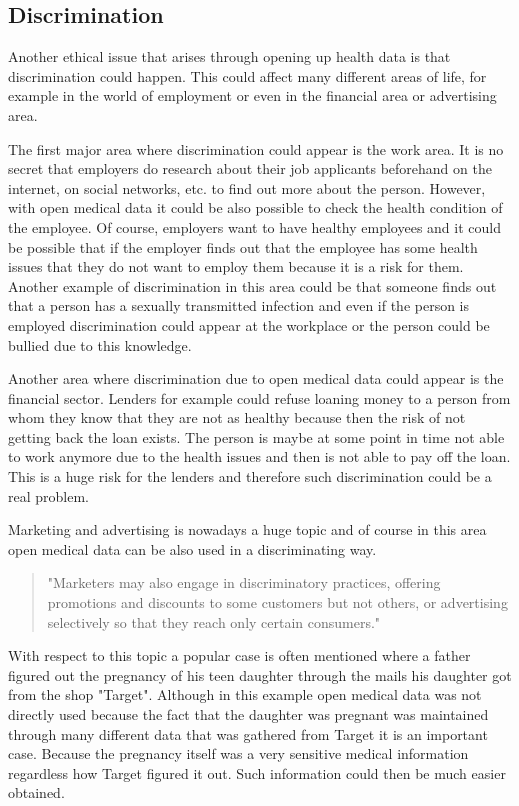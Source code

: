 \documentclass[a4paper, 11pt]{article}
\begin{document}
\subsection{Discrimination}
Another ethical issue that arises through opening up health data is that discrimination could happen. This could affect many different areas of life, for example in the world of employment or even in the financial area or advertising area. 

The first major area where discrimination could appear is the work area. It is no secret that employers do research about their job applicants beforehand on the internet, on social networks, etc. to find out more about the person. However, with open medical data it could be also possible to check the health condition of the employee. Of course, employers want to have healthy employees and it could be possible that if the employer finds out that the employee has some health issues that they do not want to employ them because it is a risk for them. Another example of discrimination in this area could be that someone finds out that  a person has a sexually transmitted infection and even if the person is employed discrimination could appear at the workplace or the person could be bullied due to this knowledge. \cite{price2019privacy}

Another area where discrimination due to open medical data could appear is the financial sector. Lenders for example could refuse loaning money to a person from whom they know that they are not as healthy because then the risk of not getting back the loan exists. The person is maybe at some point in time not able to work anymore due to the health issues and then is not able to pay off the loan. This is a huge risk for the lenders and therefore such discrimination could be a real problem. \cite{hoffman2016promise}

Marketing and advertising is nowadays a huge topic and of course in this area open medical data can be also used in a discriminating way. 
\begin{quote}
    "Marketers may also engage in discriminatory practices, offering promotions and discounts to some customers but not others, or advertising selectively so that they reach only certain consumers." \cite[p.\ 1779]{Hoffman2015}
\end{quote}
With respect to this topic a popular case is often mentioned where a father figured out the pregnancy of his teen daughter through the mails his daughter got from the shop "Target". \cite{targetPregnantDaughter}
Although in this example open medical data was not directly used because the fact that the daughter was pregnant was maintained through many different data that was gathered from Target it is an important case. Because the pregnancy itself was a very sensitive medical information regardless how Target figured it out. Such information could then be much easier obtained. 
\end{document}
